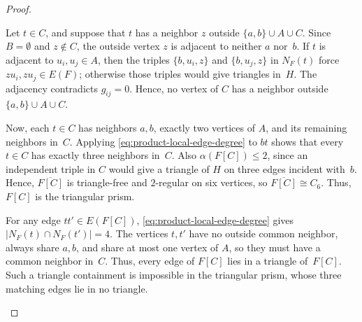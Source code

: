\documentclass[10pt,a4paper]{amsart}
\begin{document}
\begin{proof}
\begin{itemize}
Let $t\in C$, and suppose that $t$ has a neighbor $z$ outside $\{a,b\}\cup A\cup C$.
Since $B=\emptyset$ and $z\notin C$, the outside vertex $z$ is adjacent to neither $a$ nor~$b$.
If $t$ is adjacent to $u_i,u_j\in A$, then the triples $\{b,u_i,z\}$ and $\{b,u_j,z\}$ in $N_F(t)$ force $zu_i,zu_j\in E(F)$; otherwise those triples would give triangles in~$H$.
The adjacency contradicts $g_{ij}=0$.
Hence, no vertex of $C$ has a neighbor outside $\{a,b\}\cup A\cup C$.

Now, each $t\in C$ has neighbors $a,b$, exactly two vertices of $A$, and its remaining neighbors in~$C$.
Applying \eqref{eq:product-local-edge-degree} to $bt$ shows that every $t\in C$ has exactly three neighbors in~$C$.
Also $\alpha(F[C])\le 2$, since an independent triple in $C$ would give a triangle of $H$ on three edges incident with~$b$.
Hence, $\overline{F[C]}$ is triangle-free and $2$-regular on six vertices, so $\overline{F[C]}\cong C_6$.
Thus, $F[C]$ is the triangular prism.

For any edge $tt'\in E(F[C])$, \eqref{eq:product-local-edge-degree} gives $|N_F(t)\cap N_F(t')|=4$.
The vertices $t,t'$ have no outside common neighbor, always share $a,b$, and share at most one vertex of $A$, so they must have a common neighbor in~$C$.
Thus, every edge of $F[C]$ lies in a triangle of~$F[C]$.
Such a triangle containment is impossible in the triangular prism, whose three matching edges lie in no triangle.


\end{itemize}
\end{proof}
\end{document}
